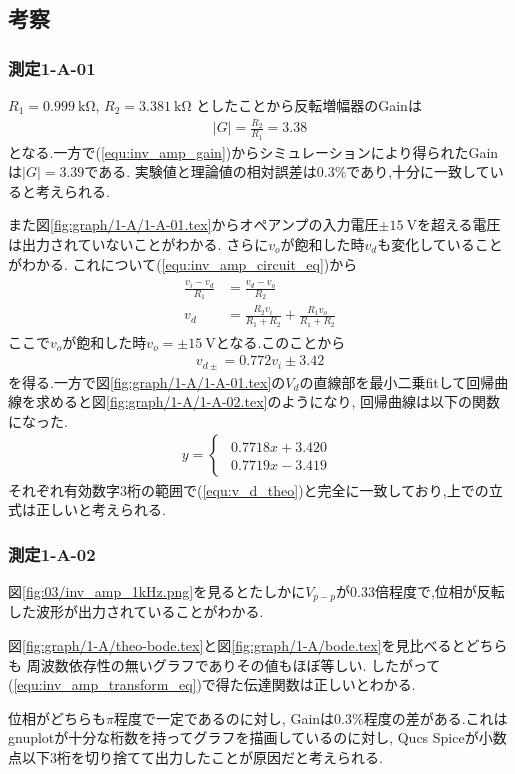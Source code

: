 \subsection{考察}
\subsubsection{測定1-A-01}
$R_1=0.999\ \si{\kilo\ohm}$, $R_2=3.381\ \si{\kilo\ohm}$
としたことから反転増幅器のGainは
\begin{align}
  |G|=\frac{R_2}{R_1}=3.38
\end{align}
となる.一方で(\ref{equ:inv_amp_gain})からシミュレーションにより得られたGainは$|G|=3.39$である.
実験値と理論値の相対誤差は$0.3\%$であり,十分に一致していると考えられる.

また図\ref{fig:graph/1-A/1-A-01.tex}からオペアンプの入力電圧$\pm15\ \si{\volt}$を超える電圧は出力されていないことがわかる.
さらに$v_o$が飽和した時$v_d$も変化していることがわかる.
これについて(\ref{equ:inv_amp_circuit_eq})から
\begin{align}
  \begin{split}
    \frac{v_i-v_d}{R_1}&=\frac{v_d-v_o}{R_2}\\
    v_d&=\frac{R_2v_i}{R_1+R_2}+\frac{R_1v_o}{R_1+R_2}
  \end{split}
\end{align}
ここで$v_o$が飽和した時$v_o=\pm15\ \si{\volt}$となる.このことから
\begin{align}
  \label{equ:v_d_theo}
  v_{d\pm}=0.772v_i\pm3.42
\end{align}
を得る.一方で図\ref{fig:graph/1-A/1-A-01.tex}の$V_d$の直線部を最小二乗fitして回帰曲線を求めると図\ref{fig:graph/1-A/1-A-02.tex}のようになり,
回帰曲線は以下の関数になった.
\begin{align}
  y=
  \begin{cases}
    \begin{split}
      0.7718x+3.420\\
      0.7719x-3.419
    \end{split}
  \end{cases}
\end{align}
それぞれ有効数字3桁の範囲で(\ref{equ:v_d_theo})と完全に一致しており,上での立式は正しいと考えられる.
\clearpage
\subsubsection{測定1-A-02}
図\ref{fig:03/inv_amp_1kHz.png}を見るとたしかに$V_{p-p}$が0.33倍程度で,位相が反転した波形が出力されていることがわかる.

図\ref{fig:graph/1-A/theo-bode.tex}と図\ref{fig:graph/1-A/bode.tex}を見比べるとどちらも
周波数依存性の無いグラフでありその値もほぼ等しい.
したがって(\ref{equ:inv_amp_transform_eq})で得た伝達関数は正しいとわかる.

位相がどちらも$\pi$程度で一定であるのに対し,
Gainは$0.3\%$程度の差がある.これはgnuplotが十分な桁数を持ってグラフを描画しているのに対し,
Qucs Spiceが小数点以下3桁を切り捨てて出力したことが原因だと考えられる.